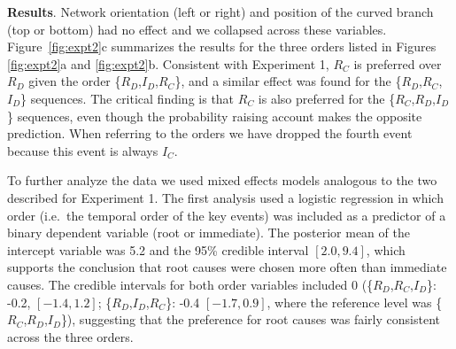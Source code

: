 \documentclass[10pt,letterpaper]{article}
\newcommand{\ev}[2]{$#1_#2$}
\begin{document}



\textbf{Results}.  
Network orientation (left or right) and position of the curved branch (top or bottom) had no effect and we collapsed across these variables.  Figure~\ref{fig:expt2}c summarizes the results for the three orders listed in Figures \ref{fig:expt2}a and \ref{fig:expt2}b.  Consistent with Experiment 1,  \ev{R}{C} is preferred over \ev{R}{D} given the order \{\ev{R}{D},\ev{I}{D},\ev{R}{C}\}, and a similar effect was found for the \{\ev{R}{D},\ev{R}{C},\ev{I}{D}\} sequences. The critical finding is that \ev{R}{C} is also preferred for the \{\ev{R}{C},\ev{R}{D},\ev{I}{D}\} sequences, even though the probability raising account makes the opposite prediction. When referring to the orders we have dropped the fourth event because this event is always \ev{I}{C}.

To further analyze the data we used mixed effects models analogous to the two described for Experiment 1. The first analysis used a logistic regression in which order (i.e.\ the temporal order of the key events) was included as a predictor of a binary dependent variable (root or immediate).  The posterior mean of the intercept variable was 5.2 and the 95\% credible interval $[2.0, 9.4]$, which supports the conclusion that root causes were chosen more often than immediate causes. The credible intervals for both order variables included 0 (\{\ev{R}{D},\ev{R}{C},\ev{I}{D}\}: -0.2, $[-1.4,1.2]$; \{\ev{R}{D},\ev{I}{D},\ev{R}{C}\}: -0.4 $[-1.7,0.9]$, where the reference level was \{\ev{R}{C},\ev{R}{D},\ev{I}{D}\}), suggesting that the preference for root causes was fairly consistent across the three orders.
\end{document}
